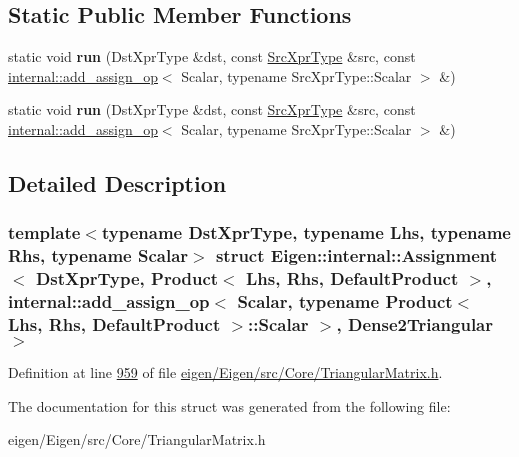 \subsection*{Static Public Member Functions}
\begin{DoxyCompactItemize}
\item 
\mbox{\label{struct_eigen_1_1internal_1_1_assignment_3_01_dst_xpr_type_00_01_product_3_01_lhs_00_01_rhs_00_01efc05729801ac09d27a309f4f0923f27_ac07b3b214716b4f8d23d0ea9ca0ae493}} 
static void {\bfseries run} (Dst\+Xpr\+Type \&dst, const \hyperlink{group___core___module_class_eigen_1_1_product}{Src\+Xpr\+Type} \&src, const \hyperlink{struct_eigen_1_1internal_1_1add__assign__op}{internal\+::add\+\_\+assign\+\_\+op}$<$ Scalar, typename Src\+Xpr\+Type\+::\+Scalar $>$ \&)
\item 
\mbox{\label{struct_eigen_1_1internal_1_1_assignment_3_01_dst_xpr_type_00_01_product_3_01_lhs_00_01_rhs_00_01efc05729801ac09d27a309f4f0923f27_ac07b3b214716b4f8d23d0ea9ca0ae493}} 
static void {\bfseries run} (Dst\+Xpr\+Type \&dst, const \hyperlink{group___core___module_class_eigen_1_1_product}{Src\+Xpr\+Type} \&src, const \hyperlink{struct_eigen_1_1internal_1_1add__assign__op}{internal\+::add\+\_\+assign\+\_\+op}$<$ Scalar, typename Src\+Xpr\+Type\+::\+Scalar $>$ \&)
\end{DoxyCompactItemize}


\subsection{Detailed Description}
\subsubsection*{template$<$typename Dst\+Xpr\+Type, typename Lhs, typename Rhs, typename Scalar$>$\newline
struct Eigen\+::internal\+::\+Assignment$<$ Dst\+Xpr\+Type, Product$<$ Lhs, Rhs, Default\+Product $>$, internal\+::add\+\_\+assign\+\_\+op$<$ Scalar, typename Product$<$ Lhs, Rhs, Default\+Product $>$\+::\+Scalar $>$, Dense2\+Triangular $>$}



Definition at line \hyperlink{eigen_2_eigen_2src_2_core_2_triangular_matrix_8h_source_l00959}{959} of file \hyperlink{eigen_2_eigen_2src_2_core_2_triangular_matrix_8h_source}{eigen/\+Eigen/src/\+Core/\+Triangular\+Matrix.\+h}.



The documentation for this struct was generated from the following file\+:\begin{DoxyCompactItemize}
\item 
eigen/\+Eigen/src/\+Core/\+Triangular\+Matrix.\+h\end{DoxyCompactItemize}
